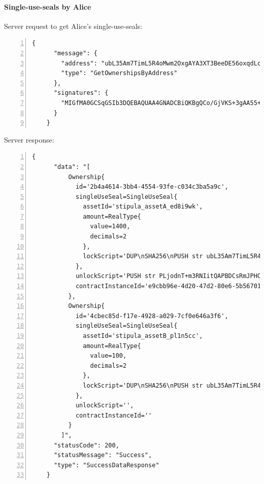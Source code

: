 \paragraph{Single-use-seals by Alice}

Server request to get Alice's single-use-seals:
{
  \small
  \begin{Verbatim}[numbers=left,xleftmargin=1cm,firstnumber=1,breaklines=true,breakanywhere=true,tabsize=2]
    {
      "message": {
        "address": "ubL35Am7TimL5R4oMwm2OxgAYA3XT3BeeDE56oxqdLc=",
        "type": "GetOwnershipsByAddress"
      },
      "signatures": {
        "MIGfMA0GCSqGSIb3DQEBAQUAA4GNADCBiQKBgQCo/GjVKS+3gAA55+kko41yINdOcCLQMSBQyuTTkKHE1mhu/TgOpivM0wLPsSga8hQMr3+v3aR0IF/vfCRf6SdiXmWx/jflmEXtnT6fkGcnV6dGNUpHWXSpwUIDt0N88jfnEqekx4S+KDCKg99sGEeHeT65fKS8lB0gjHMt9AOriwIDAQAB": "MomZTc63z7PfH35c1dL4tjXebcsW+0Zxl0nP1NQdcUFws98DX+bMWI7L0C6IO5lxvkYve4zdio1Crn97FXvngK4aVfiEZEnHOJ0tstq7uQYGErM3DDAABqPq8HH5yoKnLST2LWpO0oD8G/VXvIE6qMT5D34W1Ci0q4uh+7y3EcY="
      }
    }
  \end{Verbatim}
}

Server response:
{
  \small
  \begin{Verbatim}[numbers=left,xleftmargin=1cm,firstnumber=1,breaklines=true,breakanywhere=true,tabsize=2]
    {
      "data": "[
          Ownership{
            id='2b4a4614-3bb4-4554-93fe-c034c3ba5a9c', 
            singleUseSeal=SingleUseSeal{
              assetId='stipula_assetA_ed8i9wk', 
              amount=RealType{
                value=1400, 
                decimals=2
              }, 
              lockScript='DUP\nSHA256\nPUSH str ubL35Am7TimL5R4oMwm2OxgAYA3XT3BeeDE56oxqdLc=\nEQUAL\nCHECKSIG\nHALT\n'
            }, 
            unlockScript='PUSH str PLjodnT+m3RNIitQAPBDCsRmJPHCqrwZOY/CPiHFZGnl+DRN6soqxMy3ehTFaUwxBjjf7qfBfvTDq5oBItTFrtz1Rn5SDS1ybdbkwpKaOXVglNOw7ZEG9bbZ1mo1oA7IAjRiIilzUetCstE5rPZIf9XOXr/RQ5AHkZUn2CztsvA=\nPUSH str MIGfMA0GCSqGSIb3DQEBAQUAA4GNADCBiQKBgQCo/GjVKS+3gAA55+kko41yINdOcCLQMSBQyuTTkKHE1mhu/TgOpivM0wLPsSga8hQMr3+v3aR0IF/vfCRf6SdiXmWx/jflmEXtnT6fkGcnV6dGNUpHWXSpwUIDt0N88jfnEqekx4S+KDCKg99sGEeHeT65fKS8lB0gjHMt9AOriwIDAQAB\n', 
            contractInstanceId='e9cbb96e-4d20-47d2-80e6-5b56701800b1'
          }, 
          Ownership{
            id='4cbec85d-f17e-4928-a029-7cf0e646a3f6', 
            singleUseSeal=SingleUseSeal{
              assetId='stipula_assetB_pl1n5cc', 
              amount=RealType{
                value=100, 
                decimals=2
              }, 
              lockScript='DUP\nSHA256\nPUSH str ubL35Am7TimL5R4oMwm2OxgAYA3XT3BeeDE56oxqdLc=\nEQUAL\nCHECKSIG\nHALT\n'
            }, 
            unlockScript='', 
            contractInstanceId=''
          }
        ]",
      "statusCode": 200,
      "statusMessage": "Success",
      "type": "SuccessDataResponse"
    }
  \end{Verbatim}
}

